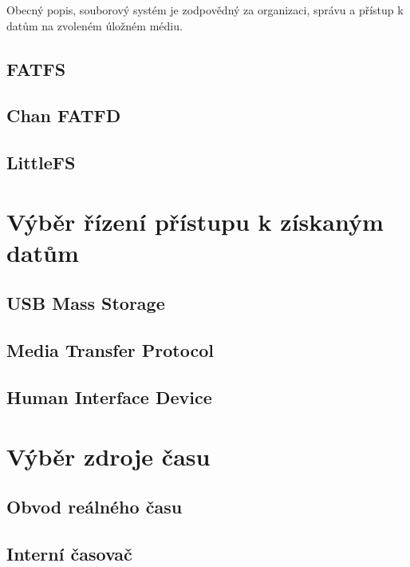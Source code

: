 Obecný popis, souborový systém je zodpovědný za organizaci, správu a přístup k datům na zvoleném úložném médiu.

\subsection{FATFS}

\subsection{Chan FATFD}

\subsection{LittleFS}



\section{Výběr řízení přístupu k získaným datům}

\subsection{USB Mass Storage}

\subsection{Media Transfer Protocol}

\subsection{Human Interface Device}

\section{Výběr zdroje času}

\subsection{Obvod reálného času}

\subsection{Interní časovač}

